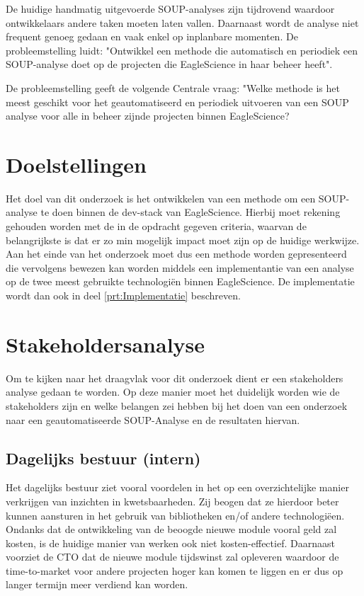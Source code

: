 De huidige handmatig uitgevoerde SOUP-analyses zijn tijdrovend waardoor ontwikkelaars andere taken moeten laten vallen. Daarnaast wordt de analyse niet frequent genoeg gedaan en vaak enkel op inplanbare momenten. De probleemstelling luidt: "Ontwikkel een methode die automatisch en periodiek een SOUP-analyse doet op de projecten die EagleScience in haar beheer heeft".

De probleemstelling geeft de volgende Centrale vraag: "Welke methode is het meest geschikt voor het geautomatiseerd en periodiek uitvoeren van een SOUP analyse voor alle in beheer zijnde projecten binnen EagleScience?


\section{Doelstellingen}\label{sec:doelstellingen}
Het doel van dit onderzoek is het ontwikkelen van een methode om een SOUP-analyse te doen binnen de dev-stack van EagleScience. Hierbij moet rekening gehouden worden met de in de opdracht gegeven criteria, waarvan de belangrijkste is dat er zo min mogelijk impact moet zijn op de huidige werkwijze. Aan het einde van het onderzoek moet dus een methode worden gepresenteerd die vervolgens bewezen kan worden middels een implementantie van een  analyse op de twee meest gebruikte technologiën binnen EagleScience. De implementatie wordt dan ook in deel \ref{prt:Implementatie} beschreven.



\section{Stakeholdersanalyse}\label{sec:stakeholdersanalyse}
Om te kijken naar het draagvlak voor dit onderzoek dient er een stakeholders analyse gedaan te worden. Op deze manier moet het duidelijk worden wie de stakeholders zijn en welke belangen zei hebben bij het doen van een onderzoek naar een geautomatiseerde SOUP-Analyse en de resultaten hiervan.

\subsection{Dagelijks bestuur (intern)}\label{subsec:dagelijks-bestuur-(intern)1}
Het dagelijks bestuur ziet vooral voordelen in het op een overzichtelijke manier verkrijgen van inzichten in kwetsbaarheden. Zij beogen dat ze hierdoor beter kunnen aansturen in het gebruik van bibliotheken en/of andere technologiëen. Ondanks dat de ontwikkeling van de beoogde nieuwe module vooral geld zal kosten, is de huidige manier van werken ook niet kosten-effectief. Daarnaast voorziet de CTO dat de nieuwe module tijdswinst zal opleveren waardoor de time-to-market voor andere projecten hoger kan komen te liggen en er dus op langer termijn meer verdiend kan worden.


